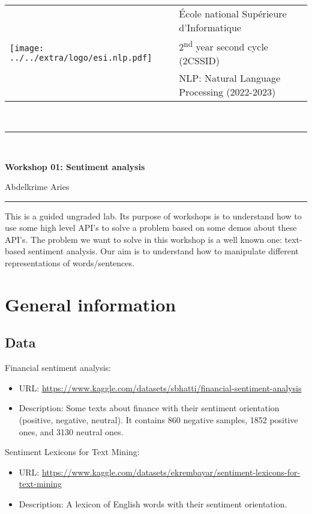 \documentclass[11pt, a4paper]{article}
\begin{document}

\noindent
\begin{tabular}{ll}
	\multirow{3}{*}{\texttt{[image: ../../extra/logo/esi.nlp.pdf]}} & \'Ecole national Supérieure d'Informatique\\
	& 2\textsuperscript{nd} year second cycle (2CSSID)\\
	& NLP: Natural Language Processing (2022-2023)
\end{tabular}\\[.25cm]
\noindent\rule{\textwidth}{2pt}\\[-0.5cm]
\begin{center}
	{\LARGE \textbf{Workshop 01: Sentiment analysis}}
	\begin{flushright}
		Abdelkrime Aries
	\end{flushright}
\end{center}\vspace{-0.5cm}
\noindent\rule{\textwidth}{2pt}

This is a guided ungraded lab. 
Its purpose of workshops is to understand how to use some high level API's to solve a problem based on some demos about these API's.
The problem we want to solve in this workshop is a well known one: text-based sentiment analysis.
Our aim is to understand how to manipulate different representations of words/sentences.


\section*{General information}

\subsection*{Data}

Financial sentiment analysis:
\begin{itemize}
	\item URL: \url{https://www.kaggle.com/datasets/sbhatti/financial-sentiment-analysis}
	\item Description: Some texts about finance with their sentiment orientation (positive, negative, neutral).
	It contains 860 negative samples, 1852 positive ones, and 3130 neutral ones.
\end{itemize}

Sentiment Lexicons for Text Mining:
\begin{itemize}
	\item URL: \url{https://www.kaggle.com/datasets/ekrembayar/sentiment-lexicons-for-text-mining}
	\item Description: A lexicon of English words with their sentiment orientation.
\end{itemize}
\end{document}
